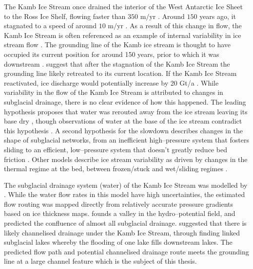 The  Kamb Ice Stream  once  drained  the  interior  of  the  West  Antarctic  Ice  Sheet  to  the Ross Ice Shelf, flowing faster than $350$ $\mbox{m/yr}$ \citep{ng2004fast}.  Around $150$ years ago, it stagnated to a speed of around $10$ $\mbox{m/yr}$ \citep{ng2004fast}.   As  a  result  of  this  change  in  flow,  the  Kamb Ice Stream is  often referenced as an example of internal variability in ice stream flow \citep[e.g.][]{hulbe2004west}.  
The grounding line of the Kamb ice stream is thought to have occupied its current position for around 150 years, prior to which it was downstream \citep{fried2014grounding}. \cite{horgan2017poststagnation} suggest that after the stagnation of the Kamb Ice Stream the grounding line likely retreated to its current location.
If the Kamb Ice Stream reactivated, ice discharge would potentially increase by 20 Gt/a \citep{jacobel2009spatial}. 
While variability in the flow of the Kamb Ice Stream is attributed to changes in subglacial drainage, there is no clear evidence of how this happened. The leading hypothesis proposes that water was rerouted  away  from  the  ice  stream  leaving  its  base  dry \citep[e.g.][]{anandakrishnan1997stagnation}, though observations of water at the base of the ice stream contradict this hypothesis \citep{engelhardt1997basal}.  A second hypothesis for the slowdown describes changes in the shape of subglacial networks, from an inefficient high--pressure system that fosters sliding to an efficient, low--pressure system that doesn’t greatly reduce bed friction \citep{lelandais2018modelled,retzlaff1993timing}. Other models describe ice stream variability as driven by changes in the thermal regime at the bed, between frozen/stuck and wet/sliding regimes \cite[e.g.]{robel2013dynamics}.

The subglacial drainage system (water) of the Kamb Ice Stream was modelled by \cite{le2013evidence}. While the water flow rates in this model have high uncertainties, the estimated flow routing was mapped directly from relatively accurate pressure gradients based on ice thickness maps. \cite{le2013evidence} founds a valley in the hydro--potential field, and predicted the confluence of almost all subglacial drainage. \cite{kim2016active} suggested that there is likely channelised drainage under the Kamb Ice Stream, through finding linked subglacial lakes whereby the flooding of one lake fills downstream lakes.  The predicted flow path and potential channelised drainage route meets the grounding line at a large channel feature which is the subject of this thesis. 


